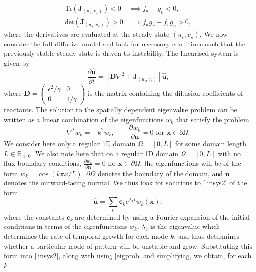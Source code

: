 \documentclass[12pt]{report}
\begin{document}
\begin{equation}\label{cond1}
    \begin{split}
\text{Tr}(\textbf{J}_{(u_\star,v_\star)})<0 &\implies f_u+g_v<0, \\
\text{det}(\textbf{J}_{(u_\star,v_\star)})>0 &\implies f_ug_v-f_vg_u>0,
\end{split}
\end{equation}
where the derivatives are evaluated at the steady-state $(u_\star,v_\star)$.
We now consider the full diffusive model and look for necessary conditions such that the previously stable steady-state is driven to instability. The linearised system is given by
\begin{equation}\label{linsys2}
    \frac{\partial \hat{\textbf{u}}}{\partial t}=\left[\textbf{D}\nabla^2+\textbf{J}_{(u_\star,v_\star)} \right]\hat{\textbf{u}},
\end{equation}
where $\textbf{D}=\begin{pmatrix}\epsilon^2/\gamma&0\\0&1/\gamma\end{pmatrix}$ is the matrix containing the diffusion coefficients of reactants.
The solution to the spatially dependent eigenvalue problem can be written as a linear combination of the eigenfunctions $w_k$ that satisfy the problem
\begin{equation}\label{eigprob}
\nabla^2w_k=-k^2w_k,\quad \quad \frac{\partial w_k}{\partial \textbf{n}}=0\text{ for } \textbf{x}\in\partial\Omega.
\end{equation}
We consider here only a regular 1D domain $\Omega=[0,L]$ for some domain length $L\in\mathbb{R}_{>0}$. We also note here that on a regular 1D domain $\Omega=[0,L]$ with no flux boundary conditions, $\frac{\partial w_k}{\partial \textbf{n}}=0\text{ for } \textbf{x}\in\partial\Omega$, the eigenfunctions will be of the form $w_k=\cos(k\pi x/L)$. $\partial\Omega$ denotes the boundary of the domain, and $\textbf{n}$ denotes the outward-facing normal.
We thus look for solutions to \eqref{linsys2} of the form
\begin{equation}\label{perturbgrow}
    \hat{\textbf{u}}=\sum_k \textbf{c}_ke^{\lambda_k t}w_k(\textbf{x}),
\end{equation}
where the constants $\textbf{c}_k$ are determined by using a Fourier expansion of the initial conditions in terms of the eigenfunctions $w_k$. $\lambda_k$ is the eigenvalue which determines the rate of temporal growth for each mode $k$, and thus determines whether a particular mode of pattern will be unstable and grow. Substituting this form into \eqref{linsys2}, along with using \eqref{eigprob} and simplifying, we obtain, for each $k$
\end{document}
